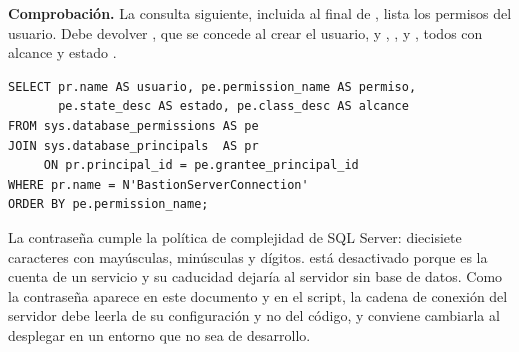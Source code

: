 \textbf{Comprobación.} La consulta siguiente, incluida al final de , lista los permisos del usuario. Debe devolver , que se concede al crear el usuario, y , ,  y , todos con alcance  y estado .

\begin{lstlisting}[style=sql]
SELECT pr.name AS usuario, pe.permission_name AS permiso,
       pe.state_desc AS estado, pe.class_desc AS alcance
FROM sys.database_permissions AS pe
JOIN sys.database_principals  AS pr
     ON pr.principal_id = pe.grantee_principal_id
WHERE pr.name = N'BastionServerConnection'
ORDER BY pe.permission_name;
\end{lstlisting}

La contraseña cumple la política de complejidad de SQL Server: diecisiete caracteres con mayúsculas, minúsculas y dígitos.  está desactivado porque es la cuenta de un servicio y su caducidad dejaría al servidor sin base de datos. Como la contraseña aparece en este documento y en el script, la cadena de conexión del servidor debe leerla de su configuración y no del código, y conviene cambiarla al desplegar en un entorno que no sea de desarrollo.
